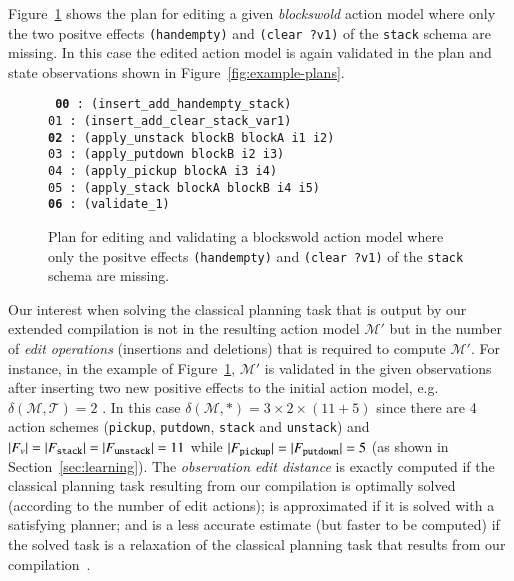Figure~\ref{fig:plan-pdistance} shows the plan for editing a given {\em blockswold} action model where only the two positve effects {\tt\small (handempty)} and {\tt\small (clear ?v1)} of the {\tt\small stack} schema are missing. In this case the edited action model is again validated in the plan and state observations shown in Figure~\ref{fig:example-plans}.

\begin{figure}[hbt!]
{\footnotesize\tt
  {\bf 00} : (insert\_add\_handempty\_stack)\\
  01 : (insert\_add\_clear\_stack\_var1)\\
  {\bf 02} : (apply\_unstack blockB blockA i1 i2)\\
  03 : (apply\_putdown blockB i2 i3)\\
  04 : (apply\_pickup blockA i3 i4)\\
  05 : (apply\_stack blockA blockB i4 i5)\\
  {\bf 06} : (validate\_1)
}
\caption{\small Plan for editing and validating a blockswold action model where only the positve effects {\tt\small (handempty)} and {\tt\small (clear ?v1)} of the {\tt\small stack} schema are missing.}
\label{fig:plan-pdistance}
\end{figure}

Our interest when solving the classical planning task that is output by our extended compilation is not in the resulting action model $\mathcal{M}'$ but in the number of {\em edit operations} (insertions and deletions) that is required to compute $\mathcal{M}'$. For instance, in the example of Figure~\ref{fig:plan-pdistance}, $\mathcal{M}'$ is validated in the given observations after inserting two new positive effects to the initial action model, e.g. $\delta(\mathcal{M},\mathcal{T})=2$ . In this case $\delta(\mathcal{M},*)=3\times 2\times (11+5)$ since there are 4 action schemes ({\small\tt pickup}, {\small\tt putdown}, {\small\tt stack} and {\small\tt unstack}) and $|F_v|=|F_{\tt stack}|=|F_{\tt unstack}|=11$ while $|F_{\tt pickup}|=|F_{\tt putdown}|=5$  (as shown in Section~\ref{sec:learning}). The {\em observation edit distance} is exactly computed if the classical planning task resulting from our compilation is optimally solved (according to the number of edit actions); is approximated if it is solved with a satisfying planner; and is a less accurate estimate (but faster to be computed) if the solved task is a relaxation of the classical planning task that results from our compilation~\cite{bonet2001planning}.

